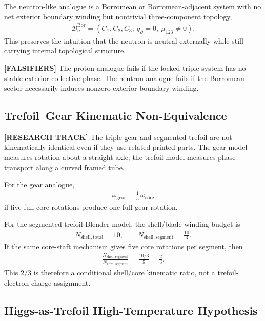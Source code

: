 The neutron-like analogue is a Borromean or Borromean-adjacent system with no net exterior boundary winding but nontrivial three-component topology,
\begin{align}
    \mathcal{B}_{n}^{\mathrm{Bor}}
    =
    (C_1,C_2,C_3;\ q_{\partial}=0,\ \mu_{123}\neq 0).
\end{align}
This preserves the intuition that the neutron is neutral externally while still carrying internal topological structure.

\textbf{[FALSIFIERS]} The proton analogue fails if the locked triple system has no stable exterior collective phase. The neutron analogue fails if the Borromean sector necessarily induces nonzero exterior boundary winding.

\subsection{Trefoil--Gear Kinematic Non-Equivalence}
\label{subsec:rt_trefoil_gear_kinematic_nonequivalence}

\textbf{[RESEARCH TRACK]} The triple gear and segmented trefoil are not kinematically identical even if they use related printed parts. The gear model measures rotation about a straight axle; the trefoil model measures phase transport along a curved framed tube.

For the gear analogue,
\begin{align}
    \omega_{\mathrm{gear}}
    =
    \frac{1}{5}\,\omega_{\mathrm{core}}
\end{align}
if five full core rotations produce one full gear rotation.

For the segmented trefoil Blender model, the shell/blade winding budget is
\begin{align}
    N_{\mathrm{shell,total}}=10,
    \qquad
    N_{\mathrm{shell,segment}}=\frac{10}{3}.
\end{align}
If the same core-staft mechanism gives five core rotations per segment, then
\begin{align}
    \frac{N_{\mathrm{shell,segment}}}{N_{\mathrm{core,segment}}}
    =
    \frac{10/3}{5}
    =
    \frac{2}{3}.
\end{align}
This $2/3$ is therefore a conditional shell/core kinematic ratio, not a trefoil-electron charge assignment.

\subsection{Higgs-as-Trefoil High-Temperature Hypothesis}
\label{subsec:rt_higgs_trefoil_parked}

